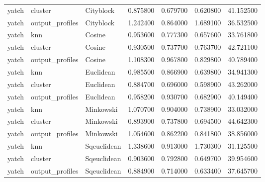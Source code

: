 \begin{tabular}{lllrrrr}
yatch & cluster & Cityblock & 0.875800 & 0.679700 & 0.620800 & 41.152500 \\
yatch & output\_profiles & Cityblock & 1.242400 & 0.864000 & 1.689100 & 36.532500 \\
yatch & knn & Cosine & 0.953600 & 0.777300 & 0.657600 & 33.761800 \\
yatch & cluster & Cosine & 0.930500 & 0.737700 & 0.763700 & 42.721100 \\
yatch & output\_profiles & Cosine & 1.108300 & 0.967800 & 0.829800 & 40.789400 \\
yatch & knn & Euclidean & 0.985500 & 0.866900 & 0.639800 & 34.941300 \\
yatch & cluster & Euclidean & 0.884700 & 0.696000 & 0.598900 & 43.262000 \\
yatch & output\_profiles & Euclidean & 0.958200 & 0.930700 & 0.682900 & 40.149400 \\
yatch & knn & Minkowski & 1.070700 & 0.904000 & 0.738900 & 33.032000 \\
yatch & cluster & Minkowski & 0.893900 & 0.737800 & 0.694500 & 44.642300 \\
yatch & output\_profiles & Minkowski & 1.054600 & 0.862200 & 0.841800 & 38.856000 \\
yatch & knn & Sqeuclidean & 1.338600 & 0.913000 & 1.730300 & 31.125500 \\
yatch & cluster & Sqeuclidean & 0.903600 & 0.792800 & 0.649700 & 39.954600 \\
yatch & output\_profiles & Sqeuclidean & 0.884900 & 0.714000 & 0.633400 & 37.645700 \\
\bottomrule
\end{tabular}
